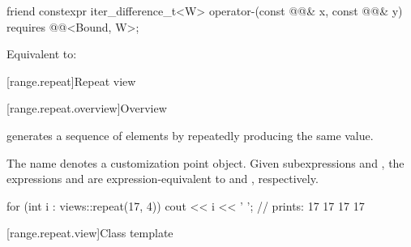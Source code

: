 \begin{itemdecl}
friend constexpr iter_difference_t<W> operator-(const @@& x, const @@& y)
  requires @@<Bound, W>;
\end{itemdecl}

\begin{itemdescr}
\pnum
\effects
Equivalent to: 
\end{itemdescr}

[range.repeat]{Repeat view}

[range.repeat.overview]{Overview}

\pnum
{} generates a sequence of elements
by repeatedly producing the same value.

\pnum
{}%
The name  denotes
a customization point object.
Given subexpressions  and ,
the expressions  and 
are expression-equivalent to
 and , respectively.

\pnum
\begin{example}
\begin{codeblock}
for (int i : views::repeat(17, 4))
  cout << i << ' ';
// prints: 17 17 17 17
\end{codeblock}
\end{example}

[range.repeat.view]{Class template }

